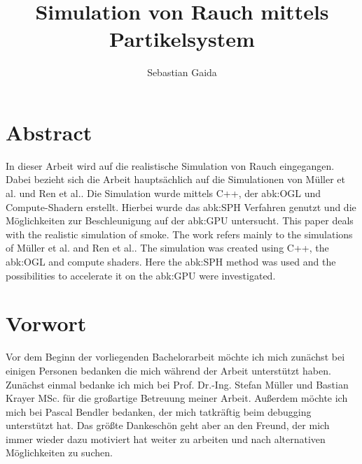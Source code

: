 \documentclass[intern,palatino]{cgBA}
\author{Sebastian Gaida}
\title{Simulation von Rauch mittels Partikelsystem}
\begin{document}
	\maketitle
	\newpage
	\tableofcontents
	\clearpage         %
	


\section*{Abstract}

In dieser Arbeit wird auf die realistische Simulation von Rauch eingegangen. Dabei bezieht sich die Arbeit hauptsächlich auf die Simulationen von Müller et al.\cite{muller2003particle} und Ren et al.\cite{ren2016fast}. Die Simulation wurde mittels C++, der \ac{abk:OGL} und Compute-Shadern erstellt. Hierbei wurde das \ac{abk:SPH} Verfahren genutzt und die Möglichkeiten zur Beschleunigung auf der \ac{abk:GPU} untersucht.
\newline \newline
This paper deals with the realistic simulation of smoke. The work refers mainly to the simulations of Müller et al.\cite{muller2003particle} and Ren et al.\cite{ren2016fast}. The simulation was created using C++, the \acl{abk:OGL} and compute shaders. Here the \acl{abk:SPH} method was used and the possibilities to accelerate it on the \ac{abk:GPU} were investigated.
\newpage


\section{Vorwort}

Vor dem Beginn der vorliegenden Bachelorarbeit möchte ich mich zunächst bei einigen Personen bedanken die mich während der Arbeit unterstützt haben.
\newline \newline
Zunächst einmal bedanke ich mich bei Prof. Dr.-Ing. Stefan Müller und Bastian Krayer MSc. für die großartige Betreuung meiner Arbeit.
\newline
Außerdem möchte ich mich bei Pascal Bendler bedanken, der mich tatkräftig beim debugging unterstützt hat.
\newline
Das größte Dankeschön geht aber an den Freund, der mich immer wieder dazu motiviert hat weiter zu arbeiten und nach alternativen Möglichkeiten zu suchen.
\newpage
\end{document}
